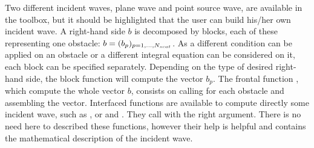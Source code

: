 Two different incident waves, plane wave and point source wave, are available in the \mudiff toolbox, but it should be highlighted that the user can build his/her own incident wave. A right-hand side $b$ is decomposed by blocks, each of these representing one obstacle: $b= (b_p)_{p=1,\ldots,N_{scat}}$. As a different condition can be applied on an obstacle or a different integral equation can be considered on it, each block can be specified separately. Depending on the type of desired right-hand side, the block function  will compute the vector $b_p$. The frontal function , which compute the whole vector $b$, consists on calling   for each obstacle and assembling the vector. Interfaced functions are available to compute directly some incident wave, such as ,  or  and . They call  with the right argument. There is no need here to described these functions, however their help is helpful and contains the mathematical description of the incident wave.

\subsubsection{}

